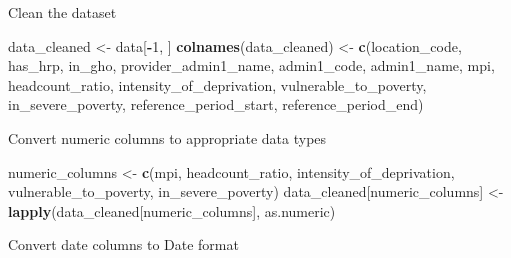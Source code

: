 \documentclass[
]{article}
\newenvironment{Shaded}{\begin{snugshade}}{\end{snugshade}}
\newcommand{\DecValTok}[1]{\textcolor[rgb]{0.00,0.00,0.81}{#1}}
\newcommand{\FunctionTok}[1]{\textcolor[rgb]{0.13,0.29,0.53}{\textbf{#1}}}
\newcommand{\NormalTok}[1]{#1}
\newcommand{\OtherTok}[1]{\textcolor[rgb]{0.56,0.35,0.01}{#1}}
\newcommand{\SpecialCharTok}[1]{\textcolor[rgb]{0.81,0.36,0.00}{\textbf{#1}}}
\newcommand{\StringTok}[1]{\textcolor[rgb]{0.31,0.60,0.02}{#1}}
\begin{document}
Clean the dataset

\begin{Shaded}
\begin{Highlighting}[]
\NormalTok{data\_cleaned }\OtherTok{\textless{}{-}}\NormalTok{ data[}\SpecialCharTok{{-}}\DecValTok{1}\NormalTok{, ]}
\FunctionTok{colnames}\NormalTok{(data\_cleaned) }\OtherTok{\textless{}{-}} \FunctionTok{c}\NormalTok{(}\StringTok{\textquotesingle{}location\_code\textquotesingle{}}\NormalTok{, }\StringTok{\textquotesingle{}has\_hrp\textquotesingle{}}\NormalTok{, }\StringTok{\textquotesingle{}in\_gho\textquotesingle{}}\NormalTok{, }\StringTok{\textquotesingle{}provider\_admin1\_name\textquotesingle{}}\NormalTok{, }\StringTok{\textquotesingle{}admin1\_code\textquotesingle{}}\NormalTok{, }\StringTok{\textquotesingle{}admin1\_name\textquotesingle{}}\NormalTok{, }\StringTok{\textquotesingle{}mpi\textquotesingle{}}\NormalTok{, }\StringTok{\textquotesingle{}headcount\_ratio\textquotesingle{}}\NormalTok{, }\StringTok{\textquotesingle{}intensity\_of\_deprivation\textquotesingle{}}\NormalTok{, }\StringTok{\textquotesingle{}vulnerable\_to\_poverty\textquotesingle{}}\NormalTok{, }\StringTok{\textquotesingle{}in\_severe\_poverty\textquotesingle{}}\NormalTok{, }\StringTok{\textquotesingle{}reference\_period\_start\textquotesingle{}}\NormalTok{, }\StringTok{\textquotesingle{}reference\_period\_end\textquotesingle{}}\NormalTok{)}
\end{Highlighting}
\end{Shaded}

Convert numeric columns to appropriate data types

\begin{Shaded}
\begin{Highlighting}[]
\NormalTok{numeric\_columns }\OtherTok{\textless{}{-}} \FunctionTok{c}\NormalTok{(}\StringTok{\textquotesingle{}mpi\textquotesingle{}}\NormalTok{, }\StringTok{\textquotesingle{}headcount\_ratio\textquotesingle{}}\NormalTok{, }\StringTok{\textquotesingle{}intensity\_of\_deprivation\textquotesingle{}}\NormalTok{, }\StringTok{\textquotesingle{}vulnerable\_to\_poverty\textquotesingle{}}\NormalTok{, }\StringTok{\textquotesingle{}in\_severe\_poverty\textquotesingle{}}\NormalTok{)}
\NormalTok{data\_cleaned[numeric\_columns] }\OtherTok{\textless{}{-}} \FunctionTok{lapply}\NormalTok{(data\_cleaned[numeric\_columns], as.numeric)}
\end{Highlighting}
\end{Shaded}

Convert date columns to Date format
\end{document}
